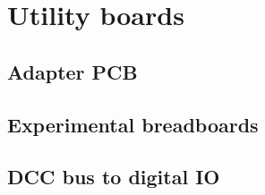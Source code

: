 \chapter{Utility boards}

\section{Adapter PCB}

\section{Experimental breadboards}

\section{DCC bus to digital IO}

